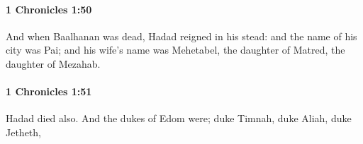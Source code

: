 		\paragraph{1 Chronicles 1:50} %
			\label{1CHRONICLES-1-50}

			And when Baalhanan was dead, Hadad reigned in his stead: and the name of his city was Pai; and his wife’s name was Mehetabel, the daughter of Matred, the daughter of Mezahab.


		\paragraph{1 Chronicles 1:51} %
			\label{1CHRONICLES-1-51}

			Hadad died also. And the dukes of Edom were; duke Timnah, duke Aliah, duke Jetheth,


